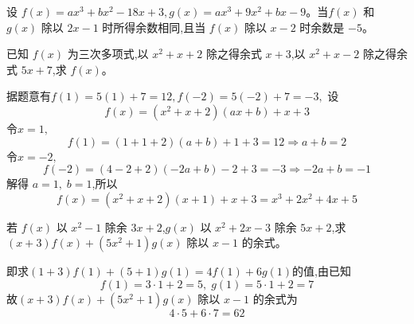 \begin{questions}
    \question 设 $f(x) = a x^3 + b x^2 - 18 x + 3, g(x) = a x^3 + 9 x^2 + b x - 9$。当$f(x)$ 和 $g(x)$ 除以 $2x - 1$ 时所得余数相同,且当 $f(x)$ 除以 $x - 2$ 时余数是 $-5$。
    
    \question 已知 $f(x)$ 为三次多项式,以 $x^2 + x + 2$ 除之得余式 $x + 3$,以 $x^2 + x - 2$ 除之得余式 $5x + 7$,求 $f(x)$。
    \begin{solution}
        据题意有$f(1)=5(1)+7=12,f(-2)=5(-2)+7=-3,$
        设$$f(x)=(x^2 + x + 2)(ax+b)+x+3$$
        令$x=1,$ $$f(1)=(1+1+2)(a+b)+1+3=12 \Rightarrow a+b=2$$
        令$x=-2,$ $$f(-2)=(4-2+2)(-2a+b)-2+3=-3 \Rightarrow -2a+b=-1$$
        解得 $a=1,\;b=1$,所以$$f(x)=(x^2 + x + 2)(x+1)+x+3=x^3 + 2x^2 + 4x + 5$$
    \end{solution}
    
    \question 若 $f(x)$ 以 $x^2 - 1$ 除余 $3x + 2$,$g(x)$ 以 $x^2 + 2x - 3$ 除余 $5x + 2$,求 $(x+3) f(x) + (5x^2 + 1) g(x)$ 除以 $x - 1$ 的余式。
    \begin{solution}
        即求$(1+3)f(1)+(5+1)g(1)=4f(1)+6g(1)$的值,由已知
        $$f(1)=3\cdot1+2=5,\;g(1)=5\cdot1+2=7$$故$(x+3) f(x) + (5x^2 + 1) g(x)$ 除以 $x - 1$ 的余式为$$4\cdot5+6\cdot7=62$$
    \end{solution}
    

\end{questions}
